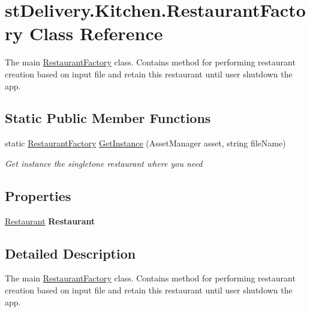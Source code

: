 \hypertarget{classst_delivery_1_1_kitchen_1_1_restaurant_factory}{}\section{st\+Delivery.\+Kitchen.\+Restaurant\+Factory Class Reference}
\label{classst_delivery_1_1_kitchen_1_1_restaurant_factory}


The main \hyperlink{classst_delivery_1_1_kitchen_1_1_restaurant_factory}{Restaurant\+Factory} class. Contains method for performing restaurant creation based on input file and retain this restaurant until user shutdown the app.  


\subsection*{Static Public Member Functions}
\begin{DoxyCompactItemize}
\item 
static \hyperlink{classst_delivery_1_1_kitchen_1_1_restaurant_factory}{Restaurant\+Factory} \hyperlink{classst_delivery_1_1_kitchen_1_1_restaurant_factory_a82b1cb3a0a73dfb4b648fabadfd12028}{Get\+Instance} (Asset\+Manager asset, string file\+Name)
\begin{DoxyCompactList}\small\item\em Get instance the singletone restaurant where you need \end{DoxyCompactList}\end{DoxyCompactItemize}
\subsection*{Properties}
\begin{DoxyCompactItemize}
\item 
\mbox{\label{classst_delivery_1_1_kitchen_1_1_restaurant_factory_a5e4c9e5e44c8829c54a79cc56a0951f5}} 
\hyperlink{classst_delivery_1_1_kitchen_1_1_restaurant}{Restaurant} {\bfseries Restaurant}
\end{DoxyCompactItemize}


\subsection{Detailed Description}
The main \hyperlink{classst_delivery_1_1_kitchen_1_1_restaurant_factory}{Restaurant\+Factory} class. Contains method for performing restaurant creation based on input file and retain this restaurant until user shutdown the app. 



